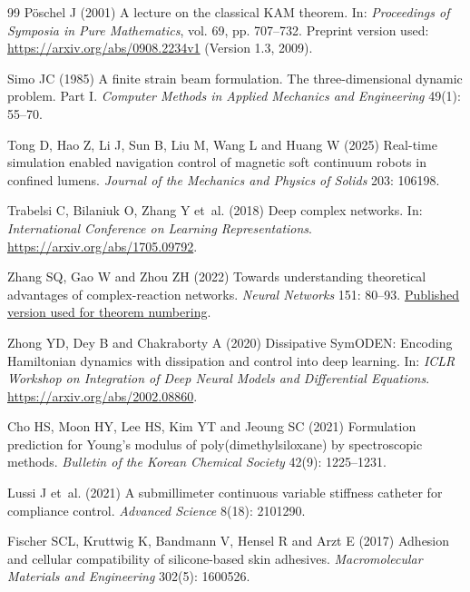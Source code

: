 \begin{thebibliography}{99}
P\"oschel J (2001) A lecture on the classical KAM theorem.
In: \textit{Proceedings of Symposia in Pure Mathematics}, vol. 69, pp. 707--732.
Preprint version used: \url{https://arxiv.org/abs/0908.2234v1} (Version 1.3, 2009).

Simo JC (1985) A finite strain beam formulation. The three-dimensional dynamic problem.
Part I. \textit{Computer Methods in Applied Mechanics and Engineering} 49(1): 55--70.

Tong D, Hao Z, Li J, Sun B, Liu M, Wang L and Huang W (2025)
Real-time simulation enabled navigation control of magnetic soft continuum robots in confined lumens.
\textit{Journal of the Mechanics and Physics of Solids} 203: 106198.

Trabelsi C, Bilaniuk O, Zhang Y et~al. (2018) Deep complex networks.
In: \textit{International Conference on Learning Representations}.
\url{https://arxiv.org/abs/1705.09792}.

Zhang SQ, Gao W and Zhou ZH (2022) Towards understanding theoretical advantages of
complex-reaction networks. \textit{Neural Networks} 151: 80--93.
\href{https://www.lamda.nju.edu.cn/zhangsq/papers/2022-CRNet-NN.pdf}{Published version used for theorem numbering}.

Zhong YD, Dey B and Chakraborty A (2020) Dissipative SymODEN: Encoding Hamiltonian
dynamics with dissipation and control into deep learning.
In: \textit{ICLR Workshop on Integration of Deep Neural Models and Differential Equations}.
\url{https://arxiv.org/abs/2002.08860}.

Cho HS, Moon HY, Lee HS, Kim YT and Jeoung SC (2021) Formulation prediction for Young's modulus of poly(dimethylsiloxane) by spectroscopic methods.
\textit{Bulletin of the Korean Chemical Society} 42(9): 1225--1231. 

Lussi J et~al. (2021) A submillimeter continuous variable stiffness catheter for compliance control.
\textit{Advanced Science} 8(18): 2101290. 

Fischer SCL, Kruttwig K, Bandmann V, Hensel R and Arzt E (2017) Adhesion and cellular compatibility of silicone-based skin adhesives.
\textit{Macromolecular Materials and Engineering} 302(5): 1600526. 


\end{thebibliography}

